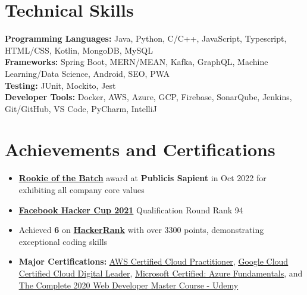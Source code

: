 \documentclass[letterpaper,13pt]{article}
\newcommand{\resumeItem}[1]{
  \item\small{
    {#1 \vspace{-2pt}}
  }
}
\newcommand{\resumeItemListStart}{\begin{itemize}}
\newcommand{\resumeItemListEnd}{\end{itemize}\vspace{-5pt}}
\begin{document}
\section{Technical Skills}
 \begin{itemize}[leftmargin=0.15in, label={}]
    \small{\item{
     \textbf{Programming Languages: }{Java, Python, C/C++, JavaScript, Typescript, HTML/CSS, Kotlin, MongoDB, MySQL} \\
     \textbf{Frameworks: }{Spring Boot, MERN/MEAN, Kafka, GraphQL, Machine Learning/Data Science, Android, SEO, PWA} \\
     \textbf{Testing: }{JUnit, Mockito, Jest} \\
     \textbf{Developer Tools: }{Docker, AWS, Azure, GCP, Firebase, SonarQube, Jenkins, Git/GitHub, VS Code, PyCharm, IntelliJ}
    }}
 \end{itemize}

\section{Achievements and Certifications}
  \resumeItemListStart      \resumeItem{\href{https://drive.google.com/file/d/1U9yLcTbFNVLfGm9tHbY7JiOYqgzFtAvm/view?usp=drive_link&usp=embed_facebook}{\textbf{Rookie of the Batch}} award at \textbf{Publicis Sapient} in Oct 2022 for exhibiting all company core values}
  \resumeItem{\href{https://www.facebook.com/codingcompetitions/hacker-cup/2021/certificate/530301721540794}{\textbf{Facebook Hacker Cup 2021}} Qualification Round Rank 94}
  \resumeItem{Achieved \textbf{6 \faStar} on \href{https://www.hackerrank.com/profile/JayantGoel001}{\textbf{HackerRank}} with over 3300 points, demonstrating exceptional coding skills}
  \resumeItem{\textbf{Major Certifications:} \href{https://drive.google.com/file/d/15qgH3MU0gf9ww9uZuMcu4e2ezFcTaZK1/view?usp=drive_link}{\underline{AWS Certified Cloud Practitioner}}, \href{https://drive.google.com/file/d/1gxAfbcVD6_U8mtxzcrPHf1gZmZ5Z20xh/view?usp=drive_link}{\underline{Google Cloud Certified Cloud Digital Leader}}, \href{https://drive.google.com/file/d/1_ghen3KbDJKEgsdudfGRUg77y8ytYC3L/view?usp=drive_link}{\underline{Microsoft Certified: Azure Fundamentals}}, and
      \href{https://drive.google.com/file/d/12THg9_3-KtjSRe7pLfw27_pqwkDtSQMx/view?usp=drive_link}{\underline{The Complete 2020 Web Developer Master Course - Udemy}}
      }
  \resumeItemListEnd
\end{document}
